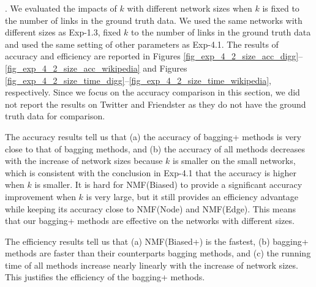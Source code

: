 \documentclass[10pt,journal,compsoc]{IEEEtran}
\newcommand{\stitle}[1]{\vspace{0.5ex}\noindent{\bf #1}}
\newcommand{\Node}{{\sf NMF(Node)}\xspace}
\newcommand{\Edge}{{\sf NMF(Edge)}\xspace}
\newcommand{\Biased}{{\sf NMF(Biased)}\xspace}
\newcommand{\Twitter}{{\sf Twitter}\xspace}
\newcommand{\Friendster}{{\sf Friendster}\xspace}
\newcommand{\Biasedp}{{\sf NMF(Biased+)}\xspace}
\begin{document}
\stitle{Exp-4.2: Impacts of network sizes}. We evaluated the impacts of $k$ with
different network sizes when $k$ is fixed to the number of links in the ground truth data.
We used the same networks with different sizes as Exp-1.3,
fixed $k$ to the number of links in the ground truth data
and used the same setting of other parameters as Exp-4.1.
The results of accuracy and efficiency are reported
in Figures \ref{fig_exp_4_2_size_acc_digg}--\ref{fig_exp_4_2_size_acc_wikipedia} and
Figures \ref{fig_exp_4_2_size_time_digg}--\ref{fig_exp_4_2_size_time_wikipedia}, respectively.
Since we focus on the accuracy comparison in
this section, we did not report the results on \Twitter and \Friendster
as they do not have the ground truth data for comparison.

The accuracy results tell us that (a) the accuracy of bagging+ methods is very close to
that of bagging methods, and (b) the accuracy of all methods decreases with the
increase of network sizes because $k$ is smaller on the small networks, which is consistent
with the conclusion in Exp-4.1 that the accuracy is higher when $k$ is smaller. It is hard
for \Biased to provide a significant accuracy improvement when $k$ is very large, but it still provides
an efficiency advantage while keeping its accuracy close to \Node and \Edge.
This means that our bagging+ methods are effective on the networks with different sizes.

The efficiency results tell us that (a) \Biasedp is the fastest, (b) bagging+ methods are faster than their counterparts bagging
methods, and (c) the running time of all methods increase nearly linearly with the
increase of network sizes. This justifies the efficiency of the bagging+ methods.
\end{document}

